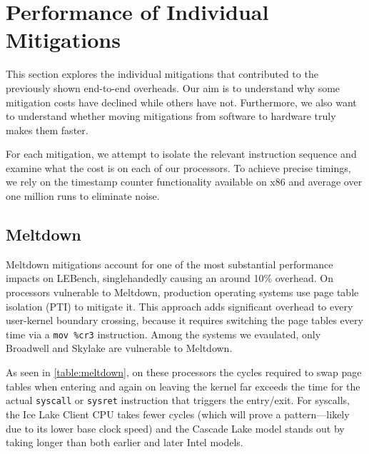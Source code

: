 \section{Performance of Individual Mitigations}
\label{s:evolution-eval}

This section explores the individual mitigations that contributed
to the previously shown end-to-end overheads.
Our aim is to understand why some mitigation costs have declined while others have not.
Furthermore, we also want to understand whether moving mitigations from software to hardware truly makes them faster.

For each mitigation, we attempt to isolate the relevant instruction sequence and examine what the cost is on each of our processors.
To achieve precise timings, we rely on the timestamp counter functionality available on x86 and average over one million runs to eliminate noise.

\subsection{Meltdown}

Meltdown mitigations account for one of the most substantial performance impacts on LEBench, singlehandedly causing an around 10\% overhead.
On processors vulnerable to Meltdown, production operating systems use page table isolation (PTI) to mitigate it.
This approach adds significant overhead to every user-kernel boundary crossing, because it requires switching the page tables every time via a \texttt{mov \%cr3} instruction.
Among the systems we evaulated, only Broadwell and Skylake are vulnerable to Meltdown.

As seen in \autoref{table:meltdown}, on these processors the cycles required to swap page tables when entering and again on leaving the kernel far exceeds the time for the actual \texttt{syscall} or \texttt{sysret} instruction that triggers the entry/exit.
For syscalls, the Ice Lake Client CPU takes fewer cycles (which will prove a pattern---likely due to its lower base clock speed) and the Cascade Lake model stands out by taking longer than both earlier and later Intel models.

